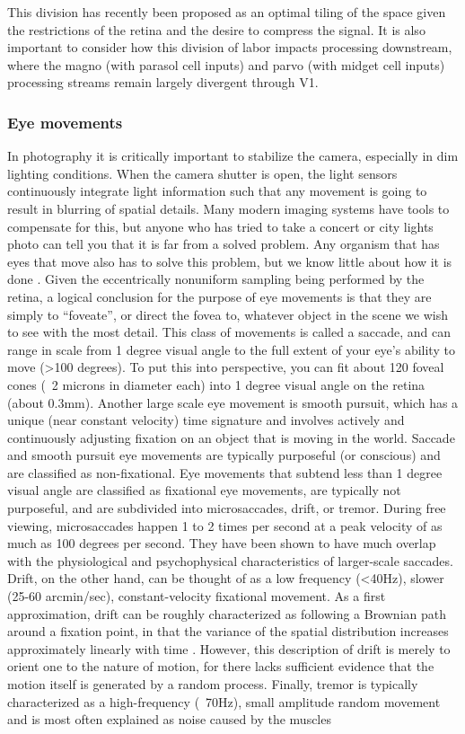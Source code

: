 This division has recently been proposed as an optimal tiling of the space given the restrictions of the retina \parencite{mcintosh2016deep} and the desire to compress the signal. It is also important to consider how this division of labor impacts processing downstream, where the magno (with parasol cell inputs) and parvo (with midget cell inputs) processing streams remain largely divergent through V1.

\subsubsection{Eye movements}
In photography it is critically important to stabilize the camera, especially in dim lighting conditions. When the camera shutter is open, the light sensors continuously integrate light information such that any movement is going to result in blurring of spatial details. Many modern imaging systems have tools to compensate for this, but anyone who has tried to take a concert or city lights photo can tell you that it is far from a solved problem. Any organism that has eyes that move also has to solve this problem, but we know little about how it is done \parencite{olshausen2010does, burak2010bayesian}. Given the eccentrically nonuniform sampling being performed by the retina, a logical conclusion for the purpose of eye movements is that they are simply to “foveate”, or direct the fovea to, whatever object in the scene we wish to see with the most detail. This class of movements is called a saccade, and can range in scale from 1 degree visual angle to the full extent of your eye’s ability to move (>100 degrees). To put this into perspective, you can fit about 120 foveal cones (~2 microns in diameter each) into 1 degree visual angle on the retina (about 0.3mm). Another large scale eye movement is smooth pursuit, which has a unique (near constant velocity) time signature and involves actively and continuously adjusting fixation on an object that is moving in the world. Saccade and smooth pursuit eye movements are typically purposeful (or conscious) and are classified as non-fixational. Eye movements that subtend less than 1 degree visual angle are classified as fixational eye movements, are typically not purposeful, and are subdivided into microsaccades, drift, or tremor. During free viewing, microsaccades happen 1 to 2  times per second at a peak velocity of as much as 100 degrees per second. They have been shown to have much overlap with the physiological and psychophysical characteristics of larger-scale saccades. Drift, on the other hand, can be thought of as a low frequency (<40Hz), slower (25-60 arcmin/sec), constant-velocity fixational movement. As a first approximation, drift can be roughly characterized as following a Brownian path around a fixation point, in that the variance of the spatial distribution increases approximately linearly with time \parencite{rucci2015unsteady}. However, this description of drift is merely to orient one to the nature of motion, for there lacks sufficient evidence that the motion itself is generated by a random process. Finally, tremor is typically characterized as a high-frequency (~70Hz), small amplitude random movement and is most often explained as noise caused by the muscles 